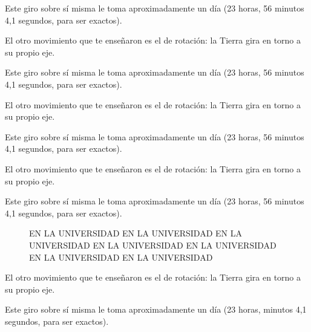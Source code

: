 \documentclass{report}
\begin{document}
Este giro sobre sí misma le toma aproximadamente un día (23 horas, 56 minutos 4,1 segundos, para ser exactos). 

El otro movimiento que te enseñaron es el de rotación: la Tierra gira en torno a su propio eje.

Este giro sobre sí misma le toma aproximadamente un día (23 horas, 56 minutos 4,1 segundos, para ser exactos). 

El otro movimiento que te enseñaron es el de rotación: la Tierra gira en torno a su propio eje.

Este giro sobre sí misma le toma aproximadamente un día (23 horas, 56 minutos 4,1 segundos, para ser exactos). 

El otro movimiento que te enseñaron es el de rotación: la Tierra gira en torno a su propio eje.

Este giro sobre sí misma le toma aproximadamente un día (23 horas, 56 minutos 4,1 segundos, para ser exactos). 

\begin{figure}
	\centering
{}\hspace{1cm}
\caption{EN LA UNIVERSIDAD EN LA UNIVERSIDAD EN LA UNIVERSIDAD EN LA UNIVERSIDAD EN LA UNIVERSIDAD EN LA UNIVERSIDAD EN LA UNIVERSIDAD}\label{f1}
\end{figure}

El otro movimiento que te enseñaron es el de rotación: la Tierra gira en torno a su propio eje.

Este giro sobre sí misma le toma aproximadamente un día (23 horas,  minutos 4,1 segundos, para ser exactos). 
\end{document}

